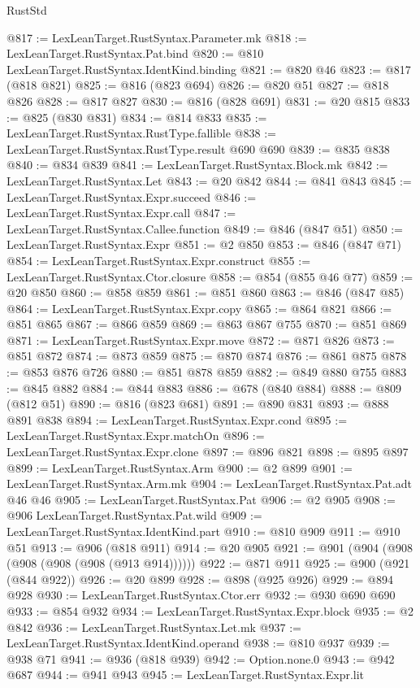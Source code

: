 \begin{lexlean}{RustStd}
\begin{coremodule}
@817 := LexLeanTarget.RustSyntax.Parameter.mk
@818 := LexLeanTarget.RustSyntax.Pat.bind
@820 := @810 LexLeanTarget.RustSyntax.IdentKind.binding
@821 := @820 @46
@823 := @817 (@818 @821)
@825 := @816 (@823 @694)
@826 := @820 @51
@827 := @818 @826
@828 := @817 @827
@830 := @816 (@828 @691)
@831 := @20 @815
@833 := @825 (@830 @831)
@834 := @814 @833
@835 := LexLeanTarget.RustSyntax.RustType.fallible
@838 := LexLeanTarget.RustSyntax.RustType.result @690 @690
@839 := @835 @838
@840 := @834 @839
@841 := LexLeanTarget.RustSyntax.Block.mk
@842 := LexLeanTarget.RustSyntax.Let
@843 := @20 @842
@844 := @841 @843
@845 := LexLeanTarget.RustSyntax.Expr.succeed
@846 := LexLeanTarget.RustSyntax.Expr.call
@847 := LexLeanTarget.RustSyntax.Callee.function
@849 := @846 (@847 @51)
@850 := LexLeanTarget.RustSyntax.Expr
@851 := @2 @850
@853 := @846 (@847 @71)
@854 := LexLeanTarget.RustSyntax.Expr.construct
@855 := LexLeanTarget.RustSyntax.Ctor.closure
@858 := @854 (@855 @46 @77)
@859 := @20 @850
@860 := @858 @859
@861 := @851 @860
@863 := @846 (@847 @85)
@864 := LexLeanTarget.RustSyntax.Expr.copy
@865 := @864 @821
@866 := @851 @865
@867 := @866 @859
@869 := @863 @867 @755
@870 := @851 @869
@871 := LexLeanTarget.RustSyntax.Expr.move
@872 := @871 @826
@873 := @851 @872
@874 := @873 @859
@875 := @870 @874
@876 := @861 @875
@878 := @853 @876 @726
@880 := @851 @878 @859
@882 := @849 @880 @755
@883 := @845 @882
@884 := @844 @883
@886 := @678 (@840 @884)
@888 := @809 (@812 @51)
@890 := @816 (@823 @681)
@891 := @890 @831
@893 := @888 @891 @838
@894 := LexLeanTarget.RustSyntax.Expr.cond
@895 := LexLeanTarget.RustSyntax.Expr.matchOn
@896 := LexLeanTarget.RustSyntax.Expr.clone
@897 := @896 @821
@898 := @895 @897
@899 := LexLeanTarget.RustSyntax.Arm
@900 := @2 @899
@901 := LexLeanTarget.RustSyntax.Arm.mk
@904 := LexLeanTarget.RustSyntax.Pat.adt @46 @46
@905 := LexLeanTarget.RustSyntax.Pat
@906 := @2 @905
@908 := @906 LexLeanTarget.RustSyntax.Pat.wild
@909 := LexLeanTarget.RustSyntax.IdentKind.part
@910 := @810 @909
@911 := @910 @51
@913 := @906 (@818 @911)
@914 := @20 @905
@921 := @901 (@904 (@908 (@908 (@908 (@908 (@913 @914))))))
@922 := @871 @911
@925 := @900 (@921 (@844 @922))
@926 := @20 @899
@928 := @898 (@925 @926)
@929 := @894 @928
@930 := LexLeanTarget.RustSyntax.Ctor.err
@932 := @930 @690 @690
@933 := @854 @932
@934 := LexLeanTarget.RustSyntax.Expr.block
@935 := @2 @842
@936 := LexLeanTarget.RustSyntax.Let.mk
@937 := LexLeanTarget.RustSyntax.IdentKind.operand
@938 := @810 @937
@939 := @938 @71
@941 := @936 (@818 @939)
@942 := Option.none.{0}
@943 := @942 @687
@944 := @941 @943
@945 := LexLeanTarget.RustSyntax.Expr.lit

\end{coremodule}
\end{lexlean}
